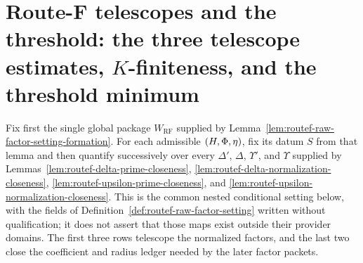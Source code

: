 \section{Route-F telescopes and the threshold: the three telescope estimates, $K$-finiteness, and the threshold minimum}\label{sec:routef-telescopes}

Fix first the single global package $W_{\mathrm{RF}}$ supplied by
Lemma~\ref{lem:routef-raw-factor-setting-formation}. For each admissible $(H,\Phi,\eta)$,
fix its datum $S$ from that lemma and then quantify successively over every
$\Delta'$, $\Delta$, $\Upsilon'$, and $\Upsilon$ supplied by
Lemmas~\ref{lem:routef-delta-prime-closeness},
\ref{lem:routef-delta-normalization-closeness},
\ref{lem:routef-upsilon-prime-closeness}, and
\ref{lem:routef-upsilon-normalization-closeness}. This is the common nested conditional
setting below, with the fields of Definition~\ref{def:routef-raw-factor-setting} written
without qualification; it does not assert that those maps exist outside their provider
domains. The first three rows telescope the normalized factors, and the last two close the
coefficient and radius ledger needed by the later factor packets.


